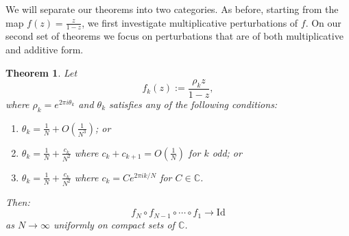 \documentclass{amsart}
\newtheorem{mainthm}{Theorem}
\theoremstyle{remark}
\theoremstyle{definition}
\newcommand{\lp}{\left(}
\newcommand{\rp}{\right)}
\begin{document}
We will separate our theorems into two categories. As before, starting from the map $\displaystyle{f(z)= \frac{z}{1-z}}$, we first investigate multiplicative perturbations of $f$. On our second set of theorems we focus on perturbations that are of both multiplicative and additive form.
\setcounter{mainthm}{0}
	\begin{mainthm}
		Let \[f_k(z):= \frac{\rho_kz}{1-z},\]
		where $\rho_k = e^{2\pi i\theta_k}$ and $\theta_k$ satisfies any of the following conditions:
		
		\begin{enumerate}
		\item
		$\displaystyle{\theta_k = \frac{1}{N} + O\lp\frac{1}{N^3}\rp}$; or
		\item
		$\displaystyle{\theta_k = \frac{1}{N} + \frac{c_k}{N^2}}$ where $c_k+ c_{k+1} = O\lp \frac{1}{N} \rp$ for $k$ odd; or
		\item
		$\displaystyle{\theta_k = \frac{1}{N} + \frac{c_k}{N^2}}$ where $\displaystyle{c_k =Ce^{2\pi ik/N}} $  for $C\in\mathbb{C}$.
		\end{enumerate}
		Then:
		\begin{equation*}
			f_N\circ f_{N-1} \circ \cdots \circ f_1 \rightarrow \text{Id}
		\end{equation*}
		as $N\to \infty$ uniformly on compact sets of $\mathbb{C}$.
	\end{mainthm}
	
\end{document}
